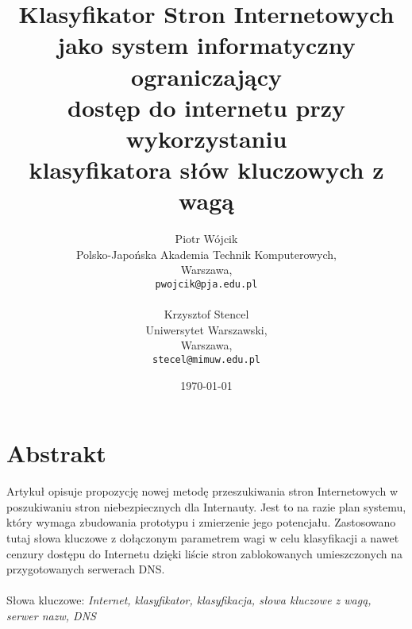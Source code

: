 \documentclass[9pt,a4paper]{extarticle}
\title{Klasyfikator Stron Internetowych\\ jako system informatyczny ograniczający\\ dostęp do internetu przy wykorzystaniu\\ klasyfikatora słów kluczowych z wagą\\}
\author{Piotr Wójcik\\
    Polsko-Japońska Akademia Technik Komputerowych,\\
    Warszawa,\\
    \texttt{pwojcik@pja.edu.pl}\\
\\
    Krzysztof Stencel\\
    Uniwersytet Warszawski,\\
    Warszawa,\\
    \texttt{stecel@mimuw.edu.pl}}
\date{\today}
\begin{document}
\maketitle



\section{Abstrakt}
\indent Artykuł opisuje propozycję nowej metodę przeszukiwania stron Internetowych w poszukiwaniu stron niebezpiecznych dla Internauty. Jest to na razie plan systemu, który wymaga zbudowania prototypu i zmierzenie jego potencjału. Zastosowano tutaj słowa kluczowe z dołączonym parametrem wagi w celu klasyfikacji a nawet cenzury dostępu do Internetu dzięki liście stron zablokowanych umieszczonych na przygotowanych serwerach DNS.\\
\\
Słowa kluczowe:
\textit{Internet, klasyfikator, klasyfikacja, słowa kluczowe z wagą, serwer nazw, DNS}
\end{document}
